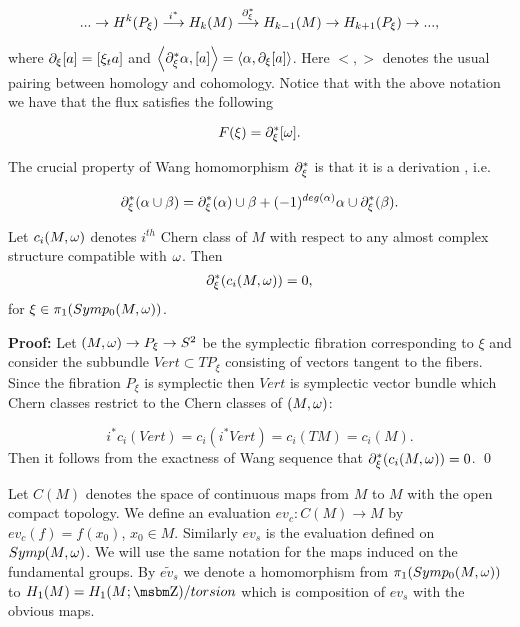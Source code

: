 $$
...\to H^k(P_{\xi})\stackrel{i^*}{\longrightarrow }H_k(M)\stackrel{\partial _\xi^*}{\longrightarrow }
H_{k-1}(M)\to H_{k+1}(P_{\xi})\to...,
$$


\noindent
where $\partial _\xi[a]=[\xi _ta]$ and $\left  <\partial _\xi^*\alpha ,[a]\right>=\left  <\alpha ,\partial _\xi [a]\right>$.
Here $< , >$ denotes the usual pairing between homology and
cohomology. Notice that with the above notation we have that the flux
satisfies the following

$$F(\xi )=\partial _\xi ^*[\omega ].$$

The crucial property of Wang homomorphism $\partial _\xi^*$ is that it is a
derivation \cite{sp}, i.e.

$$\partial _\xi^*(\alpha \cup \beta)=
\partial _\xi^*(\alpha )\cup \beta+(-1)^{deg(\alpha )}\alpha \cup \partial _\xi^*(\beta ).$$

\bigskip













\begin{Lem} \label{L:1}
Let $c_i(M,\omega )$ denotes $i^{th}$
 Chern class of 
$M$ with respect to any almost complex structure compatible with $\omega $. Then 
$$\partial _\xi ^*(c_i(M,\omega ))=0,$$
for $\xi \in \pi _1(Symp_0(M,\omega)) $.
\end{Lem}

\bigskip

{\bf Proof:} Let $(M,\omega) \to P_{\xi } \to S^2$ be the symplectic fibration 
corresponding
to $\xi $ and consider the subbundle $Vert\subset TP_{\xi }$ consisting of vectors
tangent to the fibers. Since the fibration $P_{\xi }$ is symplectic then 
$Vert$ is symplectic vector bundle which Chern classes restrict to
the Chern classes of $(M,\omega) $: 

$$i^*c_i(Vert)=c_i(i^*Vert)=c_i(TM)=c_i(M).$$ 
Then it follows from the exactness of Wang sequence 
that $\partial _\xi ^*(c_i(M,\omega ))=0$. 
\qed






\bigskip

Let $C(M)$ denotes the space of continuous maps from
$M$ to $M$ with the open compact topology. 
We define an evaluation $ev_c:C(M)\to M$
by $ev_c(f)=f(x_0)$, $x_0\in M$. Similarly $ev_s$ is
the evaluation defined on $Symp(M,\omega) $. We will use the same
notation for the  maps induced on the fundamental groups.
By $\widetilde {ev_s}$ we denote a homomorphism from
$\pi _1(Symp_0(M,\omega)) $ to $H_1(M)=H_1(M;\B Z)/torsion$ which is composition
of $ev_s$ with the obvious maps.



